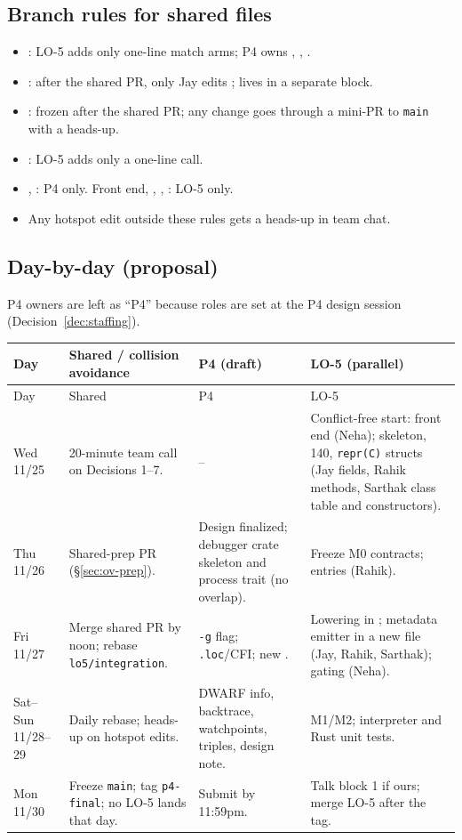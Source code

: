 \documentclass[10pt]{article}
\newcommand{\code}[1]{\texttt{\small #1}}
\begin{document}
\subsection{Branch rules for shared files}\label{sec:ov-branch}
\begin{itemize}
\item {}: LO-5 adds only one-line match arms; P4 owns , , .
\item {}: after the shared PR, only Jay edits ;  lives in a separate block.
\item {}: frozen after the shared PR; any change goes through a mini-PR to \code{main} with a heads-up.
\item {}: LO-5 adds only a one-line call.
\item {}, : P4 only. Front end, , , : LO-5 only.
\item Any hotspot edit outside these rules gets a heads-up in team chat.
\end{itemize}

\subsection{Day-by-day (proposal)}\label{sec:ov-schedule}
P4 owners are left as ``P4'' because roles are set at the P4 design session (Decision~\ref{dec:staffing}).
\begin{xltabular}{\linewidth}{@{}L{1.5cm}Y Y Y@{}}
\toprule
Day & Shared / collision avoidance & P4 (draft) & LO-5 (parallel) \\
\midrule
\endfirsthead
\toprule Day & Shared & P4 & LO-5 \\ \midrule
\endhead
Wed 11/25 & 20-minute team call on Decisions 1--7. & -- & Conflict-free start: front end (Neha);  skeleton, 140, \code{repr(C)} structs (Jay fields, Rahik methods, Sarthak class table and constructors). \\
Thu 11/26 & Shared-prep PR (\S\ref{sec:ov-prep}). & Design finalized; debugger crate skeleton and process trait (no overlap). & Freeze M0 contracts;  entries (Rahik). \\
Fri 11/27 & Merge shared PR by noon; rebase \code{lo5/integration}. & \code{-g} flag; \code{.loc}/CFI; new . & Lowering in ; metadata emitter in a new file (Jay, Rahik, Sarthak); gating (Neha). \\
Sat--Sun 11/28--29 & Daily rebase; heads-up on hotspot edits. & DWARF info, backtrace, watchpoints, triples, design note. & M1/M2; interpreter and Rust unit tests. \\
Mon 11/30 & Freeze \code{main}; tag \code{p4-final}; no LO-5 lands that day. & Submit by 11:59pm. & Talk block 1 if ours; merge LO-5 after the tag. \\
\bottomrule
\end{xltabular}
\end{document}

